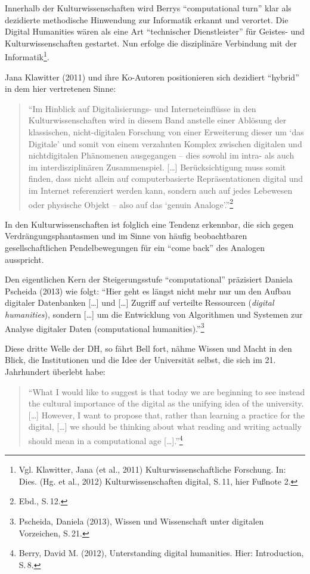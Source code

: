 \documentclass[a4paper,
fontsize=11pt,
oneside,
numbers=noperiodatend,
parskip=half-,
bibliography=totoc,
final
]{scrartcl}
\begin{document}
Innerhalb der Kulturwissenschaften wird Berrys \enquote{computational
turn} klar als dezidierte methodische Hinwendung zur Informatik erkannt
und verortet. Die Digital Humanities wären als eine Art
\enquote{technischer Dienstleister} für Geistes- und
Kulturwissenschaften gestartet. Nun erfolge die disziplinäre Verbindung
mit der Informatik\footnote{Vgl. Klawitter, Jana (et al., 2011)
  Kulturwissenschaftliche Forschung. In: Dies. (Hg. et al., 2012)
  Kulturwissenschaften digital, S.\,11, hier Fußnote 2.}.

Jana Klawitter (2011) und ihre Ko-Autoren positionieren sich dezidiert
\enquote{hybrid} in dem hier vertretenen Sinne:

\begin{quote}
\enquote{Im Hinblick auf Digitalisierungs- und Interneteinflüsse in den
Kulturwissenschaften wird in diesem Band anstelle einer Ablösung der
klassischen, nicht-digitalen Forschung von einer Erweiterung dieser um
\enquote{das Digitale} und somit von einem verzahnten Komplex zwischen
digitalen und nichtdigitalen Phänomenen ausgegangen -- dies sowohl im
intra- als auch im interdisziplinären Zusammenspiel. {[}\ldots{}{]}
Berücksichtigung muss somit finden, dass nicht allein auf
computerbasierte Repräsentationen digital und im Internet referenziert
werden kann, sondern auch auf jedes Lebewesen oder physische Objekt --
also auf das \enquote{genuin Analoge}.}\footnote{Ebd., S.\,12.}
\end{quote}

In den Kulturwissenschaften ist folglich eine Tendenz erkennbar, die
sich gegen Verdrängungsphantasmen und im Sinne von häufig beobachtbaren
gesellschaftlichen Pendelbewegungen für ein \enquote{come back} des
Analogen ausspricht.

Den eigentlichen Kern der Steigerungsstufe \enquote{computational}
präzisiert Daniela Pscheida (2013) wie folgt: \enquote{Hier geht es
längst nicht mehr nur um den Aufbau digitaler Datenbanken {[}\ldots{}{]}
und {[}\ldots{}{]} Zugriff auf verteilte Ressourcen (\emph{digital
humanities}), sondern {[}\ldots{}{]} um die Entwicklung von Algorithmen
und Systemen zur Analyse digitaler Daten (computational
humanities).}\footnote{Pscheida, Daniela (2013), Wissen und Wissenschaft
  unter digitalen Vorzeichen, S.\,21.}

Diese dritte Welle der DH, so fährt Bell fort, nähme Wissen und Macht in
den Blick, die Institutionen und die Idee der Universität selbst, die
sich im 21. Jahrhundert überlebt habe:

\begin{quote}
\enquote{What I would like to suggest is that today we are beginning to
see instead the cultural importance of the digital as the unifying idea
of the university. {[}\ldots{}{]} However, I want to propose that,
rather than learning a practice for the digital, {[}\ldots{}{]} we
should be thinking about what reading and writing actually should mean
in a computational age {[}\ldots{}{]}.}\footnote{Berry, David M. (2012),
  Unterstanding digital humanities. Hier: Introduction, S.\,8.}
\end{quote}
\end{document}

